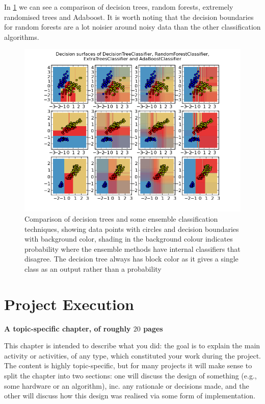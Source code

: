\documentclass[ %
                    author={Sam Phippen},
                supervisor={Dr. Rafal Bogacz},
                     title={Real time voice activity detectors in noisy personal computing environments},
                  subtitle={},
                    degree={MEng},
                      year={2012} ]{thesis}
\begin{document}
In \ref{fig:comparison} we can see a comparison of decision trees, random forests,
extremely randomised trees and Adaboost. It is worth noting that the decision
boundaries for random forests are a lot noisier around noisy data than the
other classification algorithms.

\begin{figure} \label{fig:comparison}
    \includegraphics[width=13cm]{classifier_comparison.png} \caption{Comparison
        of decision trees and some ensemble classification techniques, showing
        data points with circles and decision boundaries with background color,
        shading in the background colour indicates probability where the
        ensemble methods have internal classifiers that disagree. The decision
        tree always has block color as it gives a single class as an output
rather than a probability} \end{figure}


\chapter{Project Execution}
\label{chap:execution}

{\bf A topic-specific chapter, of roughly $20$ pages} 
\vspace{1cm} 

\noindent
This chapter is intended to describe what you did: the goal is to explain
the main activity or activities, of any type, which constituted your work 
during the project.  The content is highly topic-specific, but for many 
projects it will make sense to split the chapter into two sections: one 
will discuss the design of something (e.g., some hardware or an algorithm), 
inc. any rationale or decisions made, and the other will discuss how this 
design was realised via some form of implementation.  
\end{document}
